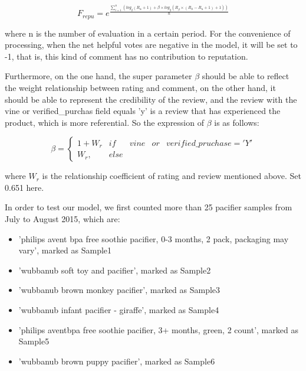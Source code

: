 \documentclass{mcmthesis}
\begin{document}
\begin{equation}
	F_{repu} =  e^{\frac{\sum_{i=1}^{n}(log_2(R_{\alpha}+1)+ \beta \times log_2(R_{\beta}\times(R_{h}-R_{u}+1)+1))}{n}}
	\label{priA}
\end{equation}

where n is the number of evaluation in a certain period. For the convenience of processing, when the net helpful votes are negative in the model, it will be set to -1, that is, this kind of comment has no contribution to reputation.

Furthermore, on the one hand, the super parameter $\beta$ should be able to reflect the weight relationship between rating and comment, on the other hand, it should be able to represent the credibility of the review, and the review with the vine or verified\_purchas field equals 'y' is a review that has experienced the product, which is more referential. So the expression of $\beta$ is as follows:

\begin{equation}
	\beta =\left\{\begin{matrix}
1+W_{r} & if &vine &or &verified\_pruchase = 'Y'\\ 
W_{r},& else
\end{matrix}\right.
\label{hyperbeta}
\end{equation}

where $W_{r}$ is the relationship coefficient of rating and review mentioned above. Set 0.651 here.

In order to test our model, we first counted more than 25 pacifier samples from July to August 2015, which are:
\begin{itemize}
	\item 'philips avent bpa free soothie pacifier, 0-3 months, 2 pack, packaging may vary', marked as Sample1
	\item 'wubbanub soft toy and pacifier', marked as Sample2
	\item 'wubbanub brown monkey pacifier', marked as Sample3
	\item 'wubbanub infant pacifier - giraffe', marked as Sample4
	\item 'philips aventbpa free soothie pacifier, 3+ months, green, 2 count', marked as Sample5
	\item 'wubbanub brown puppy pacifier', marked as Sample6
\end{itemize}
\end{document}
